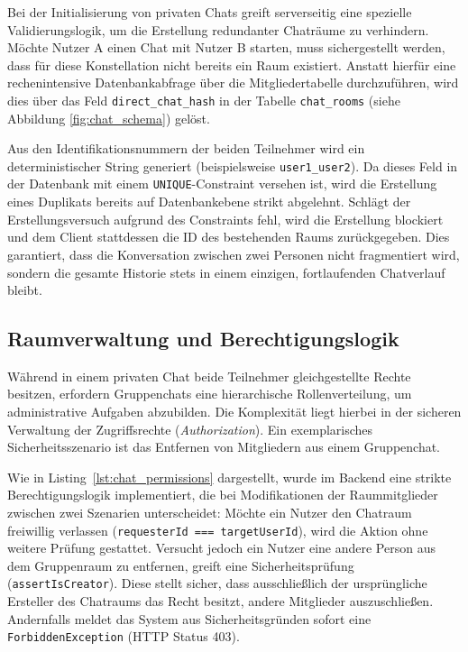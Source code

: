 Bei der Initialisierung von privaten Chats greift serverseitig eine spezielle Validierungslogik, um die Erstellung redundanter Chaträume zu verhindern. Möchte Nutzer A einen Chat mit Nutzer B starten, muss sichergestellt werden, dass für diese Konstellation nicht bereits ein Raum existiert. Anstatt hierfür eine rechenintensive Datenbankabfrage über die Mitgliedertabelle durchzuführen, wird dies über das Feld \texttt{direct\_chat\_hash} in der Tabelle \texttt{chat\_rooms} (siehe Abbildung \ref{fig:chat_schema}) gelöst. 

Aus den Identifikationsnummern der beiden Teilnehmer wird ein deterministischer String generiert (beispielsweise \texttt{user1\_user2}). Da dieses Feld in der Datenbank mit einem \texttt{UNIQUE}-Constraint versehen ist, wird die Erstellung eines Duplikats bereits auf Datenbankebene strikt abgelehnt. Schlägt der Erstellungsversuch aufgrund des Constraints fehl, wird die Erstellung blockiert und dem Client stattdessen die ID des bestehenden Raums zurückgegeben. Dies garantiert, dass die Konversation zwischen zwei Personen nicht fragmentiert wird, sondern die gesamte Historie stets in einem einzigen, fortlaufenden Chatverlauf bleibt.

\subsection{Raumverwaltung und Berechtigungslogik}
Während in einem privaten Chat beide Teilnehmer gleichgestellte Rechte besitzen, erfordern Gruppenchats eine hierarchische Rollenverteilung, um administrative Aufgaben abzubilden. Die Komplexität liegt hierbei in der sicheren Verwaltung der Zugriffsrechte (\textit{Authorization}). Ein exemplarisches Sicherheitsszenario ist das Entfernen von Mitgliedern aus einem Gruppenchat. 

Wie in Listing~\ref{lst:chat_permissions} dargestellt, wurde im Backend eine strikte Berechtigungslogik implementiert, die bei Modifikationen der Raummitglieder zwischen zwei Szenarien unterscheidet: Möchte ein Nutzer den Chatraum freiwillig verlassen (\texttt{requesterId === targetUserId}), wird die Aktion ohne weitere Prüfung gestattet. Versucht jedoch ein Nutzer eine andere Person aus dem Gruppenraum zu entfernen, greift eine Sicherheitsprüfung (\texttt{assertIsCreator}). Diese stellt sicher, dass ausschließlich der ursprüngliche Ersteller des Chatraums das Recht besitzt, andere Mitglieder auszuschließen. Andernfalls meldet das System aus Sicherheitsgründen sofort eine \texttt{ForbiddenException} (HTTP Status 403).

